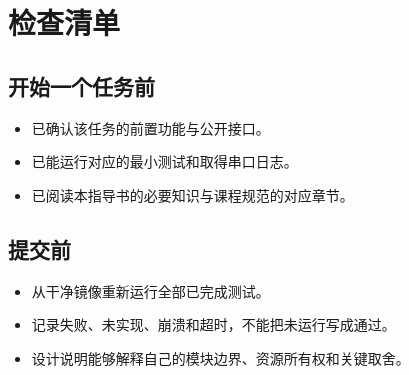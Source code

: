 \chapter{检查清单}
\section{开始一个任务前}
\begin{itemize}
  \item 已确认该任务的前置功能与公开接口。
  \item 已能运行对应的最小测试和取得串口日志。
  \item 已阅读本指导书的必要知识与课程规范的对应章节。
\end{itemize}

\section{提交前}
\begin{itemize}
  \item 从干净镜像重新运行全部已完成测试。
  \item 记录失败、未实现、崩溃和超时，不能把未运行写成通过。
  \item 设计说明能够解释自己的模块边界、资源所有权和关键取舍。
\end{itemize}
